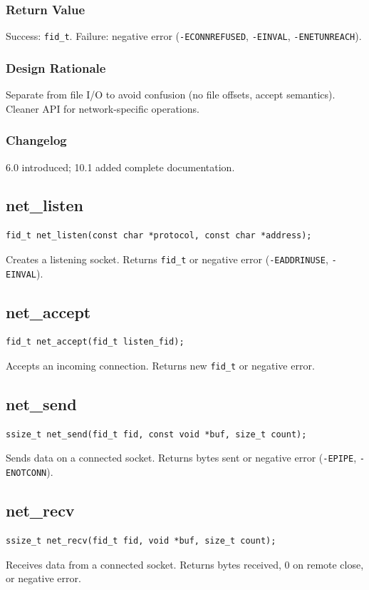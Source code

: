 \documentclass[12pt,a4paper]{article}
\begin{document}
\subsubsection{Return Value}
Success: \texttt{fid\_t}. Failure: negative error (\texttt{-ECONNREFUSED}, \texttt{-EINVAL}, \texttt{-ENETUNREACH}).

\subsubsection{Design Rationale}
Separate from file I/O to avoid confusion (no file offsets, accept semantics). Cleaner API for network-specific operations.

\subsubsection{Changelog}
6.0 introduced; 10.1 added complete documentation.

\subsection{net\_listen}
\begin{lstlisting}
fid_t net_listen(const char *protocol, const char *address);
\end{lstlisting}
Creates a listening socket. Returns \texttt{fid\_t} or negative error (\texttt{-EADDRINUSE}, \texttt{-EINVAL}).

\subsection{net\_accept}
\begin{lstlisting}
fid_t net_accept(fid_t listen_fid);
\end{lstlisting}
Accepts an incoming connection. Returns new \texttt{fid\_t} or negative error.

\subsection{net\_send}
\begin{lstlisting}
ssize_t net_send(fid_t fid, const void *buf, size_t count);
\end{lstlisting}
Sends data on a connected socket. Returns bytes sent or negative error (\texttt{-EPIPE}, \texttt{-ENOTCONN}).

\subsection{net\_recv}
\begin{lstlisting}
ssize_t net_recv(fid_t fid, void *buf, size_t count);
\end{lstlisting}
Receives data from a connected socket. Returns bytes received, 0 on remote close, or negative error.
\end{document}
